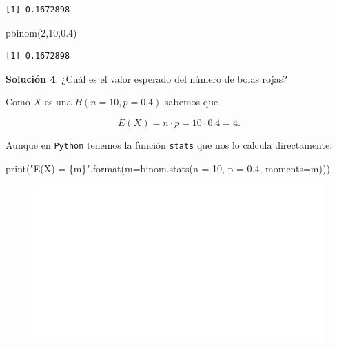 \documentclass[
  letterpaper,
  DIV=11,
  numbers=noendperiod]{scrreprt}
\newenvironment{Shaded}{\begin{snugshade}}{\end{snugshade}}
\newcommand{\BuiltInTok}[1]{\textcolor[rgb]{0.00,0.23,0.31}{#1}}
\newcommand{\DecValTok}[1]{\textcolor[rgb]{0.68,0.00,0.00}{#1}}
\newcommand{\FloatTok}[1]{\textcolor[rgb]{0.68,0.00,0.00}{#1}}
\newcommand{\FunctionTok}[1]{\textcolor[rgb]{0.28,0.35,0.67}{#1}}
\newcommand{\NormalTok}[1]{\textcolor[rgb]{0.00,0.23,0.31}{#1}}
\newcommand{\OperatorTok}[1]{\textcolor[rgb]{0.37,0.37,0.37}{#1}}
\newcommand{\SpecialCharTok}[1]{\textcolor[rgb]{0.37,0.37,0.37}{#1}}
\newcommand{\StringTok}[1]{\textcolor[rgb]{0.13,0.47,0.30}{#1}}
\begin{document}
\begin{verbatim}
[1] 0.1672898
\end{verbatim}

\begin{Shaded}
\begin{Highlighting}[]
\FunctionTok{pbinom}\NormalTok{(}\DecValTok{2}\NormalTok{,}\DecValTok{10}\NormalTok{,}\FloatTok{0.4}\NormalTok{)}
\end{Highlighting}
\end{Shaded}

\begin{verbatim}
[1] 0.1672898
\end{verbatim}

\textbf{Solución 4}. ¿Cuál es el valor esperado del número de bolas
rojas?

Como \(X\) es una \(B(n=10,p=0.4)\) sabemos que

\[E(X)=n\cdot p = 10\cdot 0.4=4.\]

Aunque en \texttt{Python} tenemos la función \texttt{stats} que nos lo
calcula directamente:

\begin{Shaded}
\begin{Highlighting}[]
\BuiltInTok{print}\NormalTok{(}\StringTok{"E(X) = }\SpecialCharTok{\{m\}}\StringTok{"}\NormalTok{.}\BuiltInTok{format}\NormalTok{(m}\OperatorTok{=}\NormalTok{binom.stats(n }\OperatorTok{=} \DecValTok{10}\NormalTok{, p }\OperatorTok{=} \FloatTok{0.4}\NormalTok{, moments}\OperatorTok{=}\StringTok{\textquotesingle{}m\textquotesingle{}}\NormalTok{)))}
\end{Highlighting}
\end{Shaded}

\begin{figure}[H]

{\centering \includegraphics{3_files/figure-pdf/unnamed-chunk-20-1.pdf}

}

\end{figure}
\end{document}
